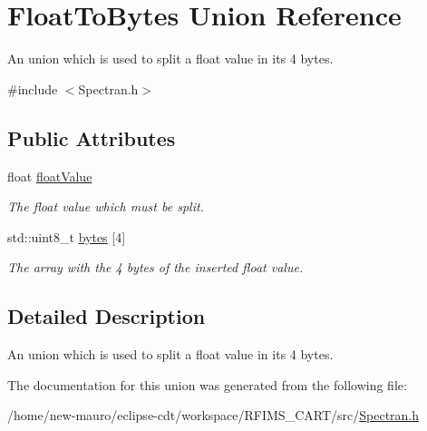\hypertarget{unionFloatToBytes}{}\section{Float\+To\+Bytes Union Reference}
\label{unionFloatToBytes}


An union which is used to split a {\ttfamily float} value in its 4 bytes.  




{\ttfamily \#include $<$Spectran.\+h$>$}

\subsection*{Public Attributes}
\begin{DoxyCompactItemize}
\item 
\mbox{\label{unionFloatToBytes_a446d779e6c020ceb138be65a8b5bb7fb}} 
float \hyperlink{unionFloatToBytes_a446d779e6c020ceb138be65a8b5bb7fb}{float\+Value}
\begin{DoxyCompactList}\small\item\em The {\ttfamily float} value which must be split. \end{DoxyCompactList}\item 
\mbox{\label{unionFloatToBytes_adc2324525bc45e5052501c6650b5afb6}} 
std\+::uint8\+\_\+t \hyperlink{unionFloatToBytes_adc2324525bc45e5052501c6650b5afb6}{bytes} \mbox{[}4\mbox{]}
\begin{DoxyCompactList}\small\item\em The array with the 4 bytes of the inserted {\ttfamily float} value. \end{DoxyCompactList}\end{DoxyCompactItemize}


\subsection{Detailed Description}
An union which is used to split a {\ttfamily float} value in its 4 bytes. 

The documentation for this union was generated from the following file\+:\begin{DoxyCompactItemize}
\item 
/home/new-\/mauro/eclipse-\/cdt/workspace/\+R\+F\+I\+M\+S\+\_\+\+C\+A\+R\+T/src/\hyperlink{Spectran_8h}{Spectran.\+h}\end{DoxyCompactItemize}
